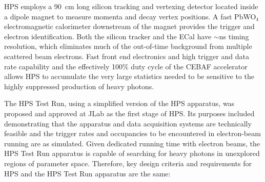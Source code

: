 \documentclass[final,3p,times,twocolumn]{elsarticle}
\begin{document}
HPS employs a 90~cm long silicon tracking and vertexing detector located inside a dipole magnet to measure 
momenta and decay vertex positions. A fast PbWO$_{4}$ electromagnetic calorimeter downstream of the 
magnet provides the trigger and electron identification. Both the silicon tracker and the ECal have $\sim$ns 
timing resolution, which eliminates much of the out-of-time background from multiple scattered beam electrons.  
Fast front end electronics and high trigger and data rate capability and the effectively 100\% duty cycle of the 
CEBAF accelerator allows HPS to accumulate the very large statistics needed to be sensitive to the highly 
suppressed production of heavy photons.

The HPS Test Run, using a simplified version of the HPS apparatus, was proposed and 
approved at JLab as the first stage of HPS. 
Its purposes included demonstrating that the apparatus and data acquisition systems are 
technically feasible and  the trigger rates and occupancies to be encountered in electron-beam 
running are as simulated. Given dedicated running time with electron beams, the HPS Test Run 
apparatus is capable of searching for heavy photons in unexplored regions of parameter space.    
Therefore, key design criteria and requirements for HPS and the HPS Test Run apparatus are the same:
\end{document}
